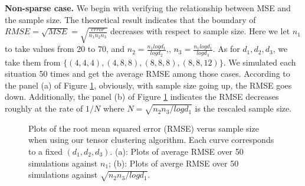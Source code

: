 \documentclass{article}
\begin{document}
\textbf{Non-sparse case.} We begin with verifying the relationship between MSE and the sample size. The theoretical result indicates that the boundary of $RMSE=\sqrt{MSE}= \sqrt{\frac{error}{n_1n_2n_3}}$ decreases with respect to sample size. Here we let $n_1$ to take values from 20 to 70, and $n_2=\frac{n_1logd_1}{logd_2}$,, $n_3 = \frac{n_1logd_1}{logd_3}$. As for $d_1, d_2, d_3$, we take them from $\{(4,4,4),(4,8,8),(8,8,8),(8,8,12)\}$. We simulated each situation 50 times and get the average RMSE among those cases. According to the panel (a) of Figure \ref{fig3}, obviously, with sample size going up, the RMSE goes down. Additionally, the panel (b) of Figure \ref{fig3} indicates the RMSE decreases roughly at the rate of $1/N$ where $N=\sqrt{n_2n_3/logd_1}$ is the rescaled sample size.\par 

\begin{figure}
	\centering
	\caption{Plots of the root mean squared error (RMSE) verus sample size when using our tensor clustering algorithm. Each curve corresponds to a fixed $(d_1,d_2,d_3)$. (a): Plots of average RMSE over 50 simulations against $n_1$; (b): Plots of averge RMSE over 50 simulations against $\sqrt{n_2n_3/logd_1}$. }
	
	\label{fig3}
\end{figure}
\end{document}
